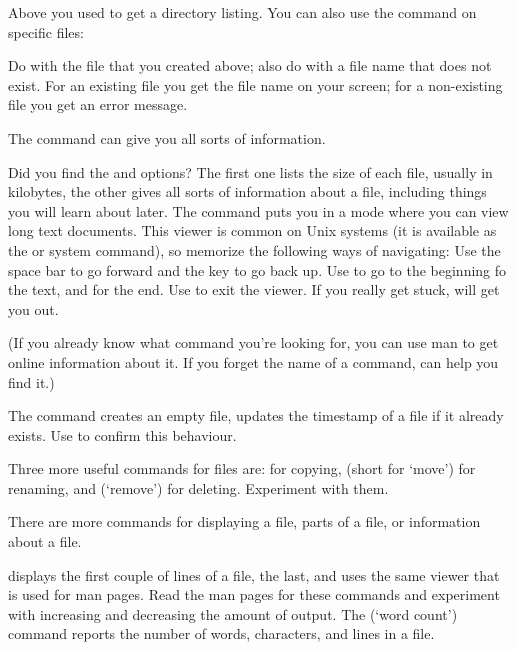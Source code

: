 Above you used  to get a directory listing. You can also use the
 command on specific files: 

\practical
{Do  with the file that you created above; also do
   with a file name that does not exist.}
{For an existing file you get the file name on your screen; for a
  non-existing file you get an error message.}
{}

The  command can give you all sorts of information.

{Did you find the  and 
  options? The first one lists the size of each file, usually in
  kilobytes, the other gives all sorts of information about a file,
  including things you will learn about later.}  
{The  command
  puts you in a mode where you can view long text documents. This
  viewer is common on Unix systems (it is available as the  or
   system command), so memorize the following ways of navigating: Use
  the space bar to go forward and the  key to go back up. Use
   to go to the beginning fo the text, and  for the end. Use
   to exit the viewer. If you really get stuck,  will
  get you out.}

(If you already know what command you're looking for, you can use man
to get online information about it. If you forget the name of a
command,  can help you find it.)

The  command creates an empty file, updates the timestamp of
a file if it already exists. Use  to confirm this behaviour.

Three more useful commands for files are:  for copying, 
(short for `move') for renaming, and  (`remove') for deleting.
Experiment with them.

There are more commands for displaying a file, parts of a file, or
information about a file. 

{ displays the first couple of lines of a file,  the
  last, and  uses the same viewer that is used for man
  pages. Read the man pages for these commands and experiment with
  increasing and decreasing the amount of output. 
  The  (`word count') command reports the number of words,
  characters, and lines in a file.}{}

